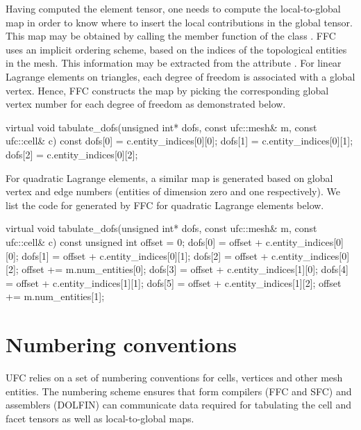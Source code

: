 Having computed the element tensor, one needs to compute the
local-to-global map in order to know where to insert the local
contributions in the global tensor. This map may be obtained by
calling the member function  of the class
. FFC uses an implicit ordering scheme, based on the
indices of the topological entities in the mesh. This information may
be extracted from the  attribute .  For
linear Lagrange elements on triangles, each degree of freedom is
associated with a global vertex. Hence, FFC constructs the map by
picking the corresponding global vertex number for each degree of
freedom as demonstrated below.
\begin{c++}
virtual void tabulate_dofs(unsigned int* dofs,
                           const ufc::mesh& m,
                           const ufc::cell& c) const
{
  dofs[0] = c.entity_indices[0][0];
  dofs[1] = c.entity_indices[0][1];
  dofs[2] = c.entity_indices[0][2];
}
\end{c++}

For quadratic Lagrange elements, a similar map is generated based on
global vertex and edge numbers (entities of dimension zero and one
respectively). We list the code for  generated by
FFC for quadratic Lagrange elements below.
\begin{c++}
virtual void tabulate_dofs(unsigned int* dofs,
                           const ufc::mesh& m,
                           const ufc::cell& c) const
{
  unsigned int offset = 0;
  dofs[0] = offset + c.entity_indices[0][0];
  dofs[1] = offset + c.entity_indices[0][1];
  dofs[2] = offset + c.entity_indices[0][2];
  offset += m.num_entities[0];
  dofs[3] = offset + c.entity_indices[1][0];
  dofs[4] = offset + c.entity_indices[1][1];
  dofs[5] = offset + c.entity_indices[1][2];
  offset += m.num_entities[1];
}
\end{c++}

\section{Numbering conventions}
\label{sec:alnes-2:numbering}

UFC relies on a set of numbering conventions for cells, vertices and
other mesh entities. The numbering scheme ensures that form compilers
(FFC and SFC) and assemblers (DOLFIN) can communicate data required
for tabulating the cell and facet tensors as well as local-to-global
maps.

